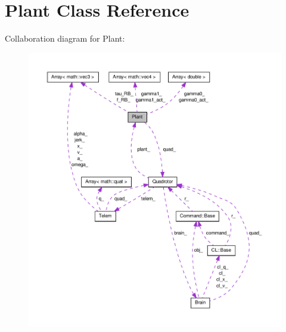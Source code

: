 \hypertarget{classPlant}{\section{\-Plant \-Class \-Reference}
\label{classPlant}
}


\-Collaboration diagram for \-Plant\-:\nopagebreak
\begin{figure}[H]
\begin{center}
\leavevmode
\includegraphics[width=350pt]{classPlant__coll__graph}
\end{center}
\end{figure}
